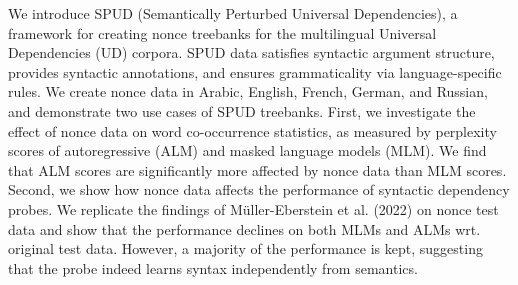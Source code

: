 We introduce SPUD (Semantically Perturbed Universal Dependencies), a framework for creating nonce treebanks for the multilingual Universal Dependencies (UD) corpora. SPUD data satisfies syntactic argument structure, provides syntactic annotations, and ensures grammaticality via language-specific rules. We create nonce data in Arabic, English, French, German, and Russian, and demonstrate two use cases of SPUD treebanks.  First, we investigate the effect of nonce data on word co-occurrence statistics, as measured by perplexity scores of autoregressive (ALM) and masked language models (MLM). We find that ALM scores are significantly more affected by nonce data than MLM scores. Second, we show how nonce data affects the performance of syntactic dependency probes. We replicate the findings of Müller-Eberstein et al. (2022) on nonce test data and show that the performance declines on both MLMs and ALMs wrt. original test data. However, a majority of the performance is kept, suggesting that the probe indeed learns syntax independently from semantics.